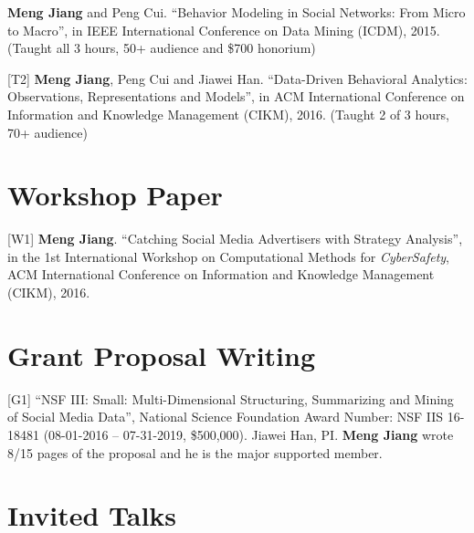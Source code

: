 \documentclass[margin, 10pt]{res}
\begin{document}
\begin{resume}
[T1] \textbf{Meng Jiang} and Peng Cui. ``Behavior Modeling in Social Networks: From Micro to Macro'', in IEEE International Conference on Data Mining (ICDM), 2015. (Taught all 3 hours, 50+ audience and \$700 honorium)

[T2] \textbf{Meng Jiang}, Peng Cui and Jiawei Han. ``Data-Driven Behavioral Analytics: Observations, Representations and Models'', in ACM International Conference on Information and Knowledge Management (CIKM), 2016. (Taught 2 of 3 hours, 70+ audience)


\section{Workshop Paper}

[W1] \textbf{Meng Jiang}. ``Catching Social Media Advertisers with Strategy Analysis'', in the 1st International Workshop on Computational Methods for \textit{CyberSafety}, ACM International Conference on Information and Knowledge Management (CIKM), 2016.


\section{Grant Proposal Writing}

[G1] ``NSF III: Small: Multi-Dimensional Structuring, Summarizing and Mining of Social Media Data'', National Science Foundation Award Number: NSF IIS 16-18481 (08-01-2016 -- 07-31-2019, \$500,000). Jiawei Han, PI. \textbf{Meng Jiang} wrote 8/15 pages of the proposal and he is the major supported member.


\section{Invited Talks}


\end{resume}
\end{document}
